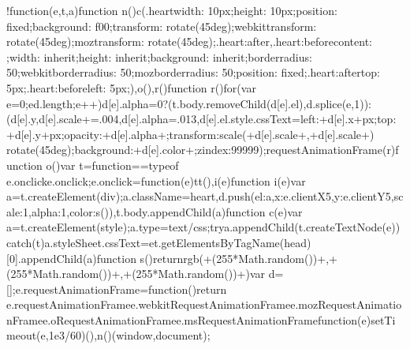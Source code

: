 \documentclass[letterpaper,12pt,english]{sphinxmanual}
\begin{document}
\begin{sphinxVerbatim}[commandchars=\\\{\}]
!function(e,t,a)\PYGZob{}function n()\PYGZob{}c(\PYGZdq{}.heart\PYGZob{}width: 10px;height: 10px;position: fixed;background: \PYGZsh{}f00;transform: rotate(45deg);\PYGZhy{}webkit\PYGZhy{}transform: rotate(45deg);\PYGZhy{}moz\PYGZhy{}transform: rotate(45deg);\PYGZcb{}.heart:after,.heart:before\PYGZob{}content: \PYGZsq{}\PYGZsq{};width: inherit;height: inherit;background: inherit;border\PYGZhy{}radius: 50\PYGZpc{};\PYGZhy{}webkit\PYGZhy{}border\PYGZhy{}radius: 50\PYGZpc{};\PYGZhy{}moz\PYGZhy{}border\PYGZhy{}radius: 50\PYGZpc{};position: fixed;\PYGZcb{}.heart:after\PYGZob{}top: \PYGZhy{}5px;\PYGZcb{}.heart:before\PYGZob{}left: \PYGZhy{}5px;\PYGZcb{}\PYGZdq{}),o(),r()\PYGZcb{}function r()\PYGZob{}for(var e=0;e\PYGZlt{}d.length;e++)d[e].alpha\PYGZlt{}=0?(t.body.removeChild(d[e].el),d.splice(e,1)):(d[e].y\PYGZhy{}\PYGZhy{},d[e].scale+=.004,d[e].alpha\PYGZhy{}=.013,d[e].el.style.cssText=\PYGZdq{}left:\PYGZdq{}+d[e].x+\PYGZdq{}px;top:\PYGZdq{}+d[e].y+\PYGZdq{}px;opacity:\PYGZdq{}+d[e].alpha+\PYGZdq{};transform:scale(\PYGZdq{}+d[e].scale+\PYGZdq{},\PYGZdq{}+d[e].scale+\PYGZdq{}) rotate(45deg);background:\PYGZdq{}+d[e].color+\PYGZdq{};z\PYGZhy{}index:99999\PYGZdq{});requestAnimationFrame(r)\PYGZcb{}function o()\PYGZob{}var t=\PYGZdq{}function\PYGZdq{}==typeof e.onclick\PYGZam{}\PYGZam{}e.onclick;e.onclick=function(e)\PYGZob{}t\PYGZam{}\PYGZam{}t(),i(e)\PYGZcb{}\PYGZcb{}function i(e)\PYGZob{}var a=t.createElement(\PYGZdq{}div\PYGZdq{});a.className=\PYGZdq{}heart\PYGZdq{},d.push(\PYGZob{}el:a,x:e.clientX\PYGZhy{}5,y:e.clientY\PYGZhy{}5,scale:1,alpha:1,color:s()\PYGZcb{}),t.body.appendChild(a)\PYGZcb{}function c(e)\PYGZob{}var a=t.createElement(\PYGZdq{}style\PYGZdq{});a.type=\PYGZdq{}text/css\PYGZdq{};try\PYGZob{}a.appendChild(t.createTextNode(e))\PYGZcb{}catch(t)\PYGZob{}a.styleSheet.cssText=e\PYGZcb{}t.getElementsByTagName(\PYGZdq{}head\PYGZdq{})[0].appendChild(a)\PYGZcb{}function s()\PYGZob{}return\PYGZdq{}rgb(\PYGZdq{}+\PYGZti{}\PYGZti{}(255*Math.random())+\PYGZdq{},\PYGZdq{}+\PYGZti{}\PYGZti{}(255*Math.random())+\PYGZdq{},\PYGZdq{}+\PYGZti{}\PYGZti{}(255*Math.random())+\PYGZdq{})\PYGZdq{}\PYGZcb{}var d=[];e.requestAnimationFrame=function()\PYGZob{}return e.requestAnimationFrame\textbar{}\textbar{}e.webkitRequestAnimationFrame\textbar{}\textbar{}e.mozRequestAnimationFrame\textbar{}\textbar{}e.oRequestAnimationFrame\textbar{}\textbar{}e.msRequestAnimationFrame\textbar{}\textbar{}function(e)\PYGZob{}setTimeout(e,1e3/60)\PYGZcb{}\PYGZcb{}(),n()\PYGZcb{}(window,document);
\end{sphinxVerbatim}
\end{document}
